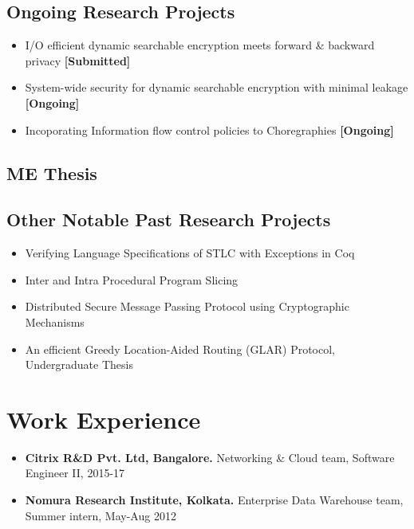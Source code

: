 \documentclass[9pt,a4paper]{moderncv}
\begin{document}
\subsection{Ongoing Research Projects}
\begin{itemize}
\item I/O efficient dynamic searchable encryption meets forward \& backward privacy \textbf{\textsf{[Submitted]}}
\item System-wide security for dynamic searchable encryption with minimal leakage \textsf{\textbf{[Ongoing]}}
\item Incoporating Information flow control policies to Choregraphies \textsf{\textbf{[Ongoing]}}
\end{itemize}
\subsection{ME Thesis}
\subsection{Other Notable Past Research Projects}
\begin{itemize}
\item Verifying Language Specifications of STLC with Exceptions in Coq %
\item Inter and Intra Procedural Program Slicing%
\item Distributed Secure Message Passing Protocol using Cryptographic Mechanisms%
\item An efficient Greedy Location-Aided Routing (GLAR) Protocol, Undergraduate Thesis
\end{itemize}
\section{Work Experience}
\begin{itemize}
\item \textbf{Citrix R\&D Pvt. Ltd, Bangalore.} Networking \& Cloud team, Software Engineer II, 2015-17
\item \textbf{Nomura Research Institute, Kolkata.} Enterprise Data Warehouse team, Summer intern, May-Aug 2012
\end{itemize}
\end{document}
